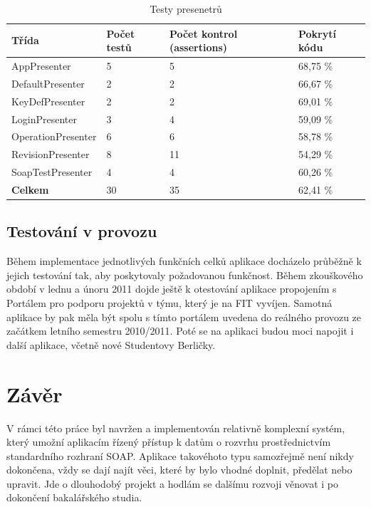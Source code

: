 \documentclass[11pt,twoside,a4paper]{book}
\begin{document}
\begin{table}
\begin{center}
\begin{tabular}{|l|l|l|l|}
\hline
\textbf{Třída} & \textbf{Počet testů} & \textbf{Počet kontrol (assertions)} & \textbf{Pokrytí kódu} \\
\hline
\hline
AppPresenter & 5 & 5 & 68,75 \% \\
\hline
DefaultPresenter & 2 & 2 & 66,67 \% \\
\hline
KeyDefPresenter & 2 & 2 & 69,01 \% \\
\hline
LoginPresenter & 3 & 4 & 59,09 \% \\
\hline
OperationPresenter & 6 & 6 & 58,78 \% \\
\hline
RevisionPresenter & 8 & 11 & 54,29 \% \\
\hline
SoapTestPresenter & 4 & 4 & 60,26 \% \\
\hline
\textbf{Celkem} & 30 & 35 & 62,41 \% \\
\hline
\end{tabular}
\end{center}
\caption{Testy presenetrů}
\label{tab:tab2}
\end{table}


\section{Testování v provozu}

Během implementace jednotlivých funkčních celků aplikace docházelo průběžně k jejich testování tak, aby poskytovaly požadovanou funkčnost. Během zkouškového období v lednu a únoru 2011 dojde ještě k otestování aplikace propojením s Portálem pro podporu projektů v týmu, který je na FIT vyvíjen. Samotná aplikace by pak měla být spolu s tímto portálem uvedena do reálného provozu ze začátkem letního semestru 2010/2011. Poté se na aplikaci budou moci napojit i další aplikace, včetně nové Studentovy Berličky.

\chapter{Závěr}
V rámci této práce byl navržen a implementován relativně komplexní systém, který umožní aplikacím řízený přístup k datům o rozvrhu prostřednictvím standardního rozhraní SOAP. Aplikace takovéhoto typu samozřejmě není nikdy dokončena, vždy se dají najít věci, které by bylo vhodné doplnit, předělat nebo upravit. Jde o dlouhodobý projekt a hodlám se dalšímu rozvoji věnovat i po dokončení bakalářského studia.
\end{document}
